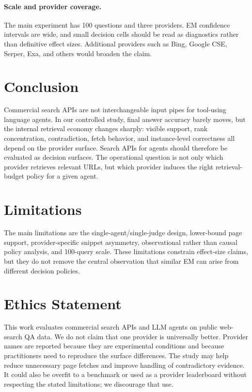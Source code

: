 \paragraph{Scale and provider coverage.}
The main experiment has 100 questions and three providers. EM confidence intervals are wide, and small decision cells should be read as diagnostics rather than definitive effect sizes. Additional providers such as Bing, Google CSE, Serper, Exa, and others would broaden the claim.

\section{Conclusion}

Commercial search APIs are not interchangeable input pipes for tool-using language agents. In our controlled study, final answer accuracy barely moves, but the internal retrieval economy changes sharply: visible support, rank concentration, contradiction, fetch behavior, and instance-level correctness all depend on the provider surface. Search APIs for agents should therefore be evaluated as decision surfaces. The operational question is not only which provider retrieves relevant URLs, but which provider induces the right retrieval-budget policy for a given agent.

\section*{Limitations}
The main limitations are the single-agent/single-judge design, lower-bound page support, provider-specific snippet asymmetry, observational rather than causal policy analysis, and 100-query scale. These limitations constrain effect-size claims, but they do not remove the central observation that similar EM can arise from different decision policies.

\section*{Ethics Statement}
This work evaluates commercial search APIs and LLM agents on public web-search QA data. We do not claim that one provider is universally better. Provider names are reported because they are experimental conditions and because practitioners need to reproduce the surface differences. The study may help reduce unnecessary page fetches and improve handling of contradictory evidence. It could also be overfit to a benchmark or used as a provider leaderboard without respecting the stated limitations; we discourage that use.

